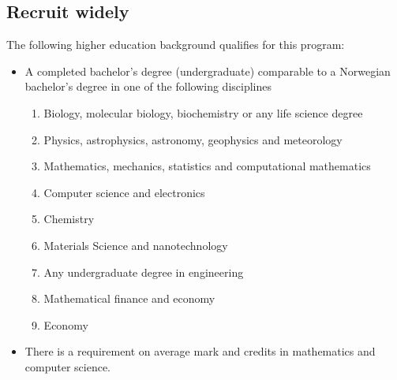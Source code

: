 \documentclass[%
oneside,                 %
final,                   %
10pt]{article}
\begin{document}
\subsection{Recruit widely}
\begin{block}{}
The following higher education background qualifies for this program:

\begin{itemize}
\item A completed bachelor's degree (undergraduate) comparable to a Norwegian bachelor's degree in one of the following disciplines
\begin{enumerate}

 \item Biology, molecular biology, biochemistry  or any life science degree

 \item Physics, astrophysics, astronomy, geophysics and meteorology

 \item Mathematics, mechanics, statistics and computational mathematics

 \item Computer science and electronics

 \item Chemistry

 \item Materials Science and nanotechnology

 \item Any undergraduate degree in engineering

 \item Mathematical finance and economy

 \item Economy

\end{enumerate}

\noindent
\item There is a requirement on average mark and credits in mathematics and computer science.
\end{itemize}

\noindent
\end{block}


\end{document}
